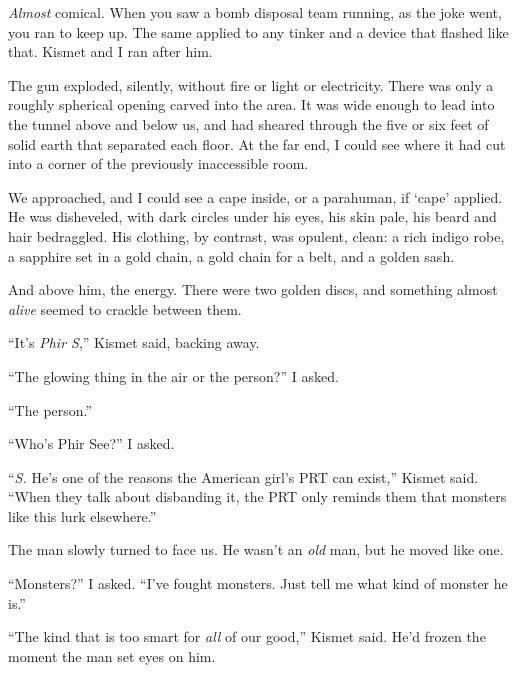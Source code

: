 \emph{Almost} comical.  When you saw a bomb disposal team running, as the joke went, you ran to keep up.  The same applied to any tinker and a device that flashed like that.  Kismet and I ran after him.



The gun exploded, silently, without fire or light or electricity.  There was only a roughly spherical opening carved into the area.  It was wide enough to lead into the tunnel above and below us, and had sheared through the five or six feet of solid earth that separated each floor.  At the far end, I could see where it had cut into a corner of the previously inaccessible room.



We approached, and I could see a cape inside, or a parahuman, if `cape' applied.  He was disheveled, with dark circles under his eyes, his skin pale, his beard and hair bedraggled.  His clothing, by contrast, was opulent, clean: a rich indigo robe, a sapphire set in a gold chain, a gold chain for a belt, and a golden sash.



And above him, the energy.  There were two golden discs, and something almost \emph{alive} seemed to crackle between them.



``It's \emph{Phir S},'' Kismet said, backing away.



``The glowing thing in the air or the person?''  I asked.



``The person.''



``Who's Phir See?''  I asked.



``\emph{S.  }He's one of the reasons the American girl's PRT can exist,'' Kismet said.  ``When they talk about disbanding it, the PRT only reminds them that monsters like this lurk elsewhere.''



The man slowly turned to face us.  He wasn't an \emph{old} man, but he moved like one.



``Monsters?''  I asked.  ``I've fought monsters.  Just tell me what kind of monster he is.''



``The kind that is too smart for \emph{all} of our good,'' Kismet said.  He'd frozen the moment the man set eyes on him.



